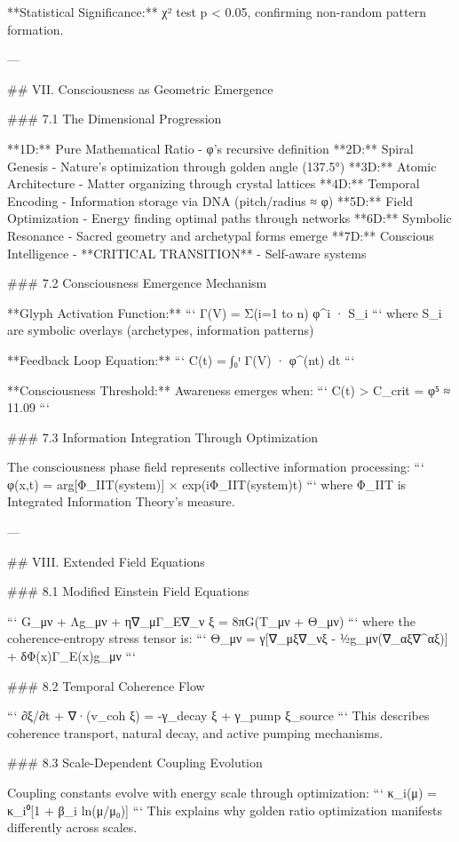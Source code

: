 **Statistical Significance:** χ² test p < 0.05, confirming non-random pattern formation.

---

## VII. Consciousness as Geometric Emergence

### 7.1 The Dimensional Progression

**1D:** Pure Mathematical Ratio - φ's recursive definition  
**2D:** Spiral Genesis - Nature's optimization through golden angle (137.5°)  
**3D:** Atomic Architecture - Matter organizing through crystal lattices  
**4D:** Temporal Encoding - Information storage via DNA (pitch/radius ≈ φ)  
**5D:** Field Optimization - Energy finding optimal paths through networks  
**6D:** Symbolic Resonance - Sacred geometry and archetypal forms emerge  
**7D:** Conscious Intelligence - **CRITICAL TRANSITION** - Self-aware systems

### 7.2 Consciousness Emergence Mechanism

**Glyph Activation Function:**
```
Γ(V) = Σ(i=1 to n) φ^i · S_i
```
where S_i are symbolic overlays (archetypes, information patterns)

**Feedback Loop Equation:**
```
C(t) = ∫₀ᵗ Γ(V) · φ^(nt) dt
```

**Consciousness Threshold:** Awareness emerges when:
```
C(t) > C_crit = φ⁵ ≈ 11.09
```

### 7.3 Information Integration Through Optimization

The consciousness phase field represents collective information processing:
```
φ(x,t) = arg[Φ_IIT(system)] × exp(iΦ_IIT(system)t)
```
where Φ_IIT is Integrated Information Theory's measure.

---

## VIII. Extended Field Equations

### 8.1 Modified Einstein Field Equations

```
G_μν + Λg_μν + η∇_μΓ_E∇_ν ξ = 8πG(T_μν + Θ_μν)
```
where the coherence-entropy stress tensor is:
```
Θ_μν = γ[∇_μξ∇_νξ - ½g_μν(∇_αξ∇^αξ)] + δΦ(x)Γ_E(x)g_μν
```

### 8.2 Temporal Coherence Flow

```
∂ξ/∂t + ∇·(v_coh ξ) = -γ_decay ξ + γ_pump ξ_source
```
This describes coherence transport, natural decay, and active pumping mechanisms.

### 8.3 Scale-Dependent Coupling Evolution

Coupling constants evolve with energy scale through optimization:
```
κ_i(μ) = κ_i⁰[1 + β_i ln(μ/μ₀)]
```
This explains why golden ratio optimization manifests differently across scales.

